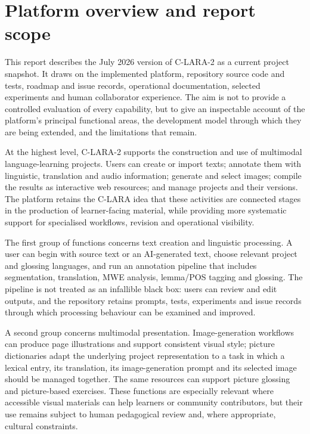 \section{Platform overview and report scope}

This report describes the July 2026 version of C-LARA-2 as a current project
snapshot. It draws on the implemented platform, repository source code and
tests, roadmap and issue records, operational documentation, selected
experiments and human collaborator experience. The aim is not to provide a
controlled evaluation of every capability, but to give an inspectable account
of the platform's principal functional areas, the development model through
which they are being extended, and the limitations that remain.

At the highest level, C-LARA-2 supports the construction and use of
multimodal language-learning projects. Users can create or import texts;
annotate them with linguistic, translation and audio information; generate
and select images; compile the results as interactive web resources; and
manage projects and their versions. The platform retains the C-LARA idea that
these activities are connected stages in the production of learner-facing
material, while providing more systematic support for specialised workflows,
revision and operational visibility.

The first group of functions concerns text creation and linguistic
processing. A user can begin with source text or an AI-generated text, choose
relevant project and glossing languages, and run an annotation pipeline that
includes segmentation, translation, MWE analysis, lemma/POS tagging and
glossing. The pipeline is not treated as an infallible black box: users can
review and edit outputs, and the repository retains prompts, tests,
experiments and issue records through which processing behaviour can be
examined and improved.

A second group concerns multimodal presentation. Image-generation workflows
can produce page illustrations and support consistent visual style; picture
dictionaries adapt the underlying project representation to a task in which a
lexical entry, its translation, its image-generation prompt and its selected
image should be managed together. The same resources can support picture
glossing and picture-based exercises. These functions are especially relevant
where accessible visual materials can help learners or community contributors,
but their use remains subject to human pedagogical review and, where
appropriate, cultural constraints.

